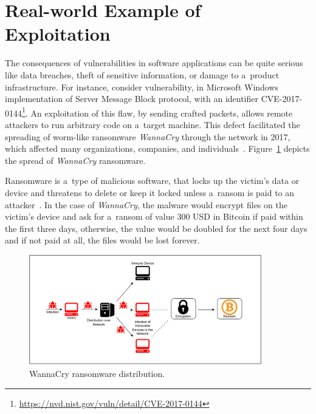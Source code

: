   \section{Real-world Example of Exploitation}
  The consequences of vulnerabilities in software applications can be quite serious like data breaches,
  theft of sensitive information, or damage to a~product infrastructure. For instance, consider
  vulnerability, in Microsoft Windows implementation of Server Message Block protocol, with an identifier
  CVE-2017-0144\footnote{\href{https://nvd.nist.gov/vuln/detail/CVE-2017-0144}{https://nvd.nist.gov/vuln/detail/CVE-2017-0144}}.
  An exploitation of this flaw, by sending crafted packets, allows remote attackers to run
  arbitrary code on a~target machine. This defect facilitated the spreading of worm-like ransomware
  \emph{WannaCry} through the network in 2017, which affected many organizations, companies,
  and individuals~\cite{WannaCry}. Figure~\ref{wannacryDistribution} depicts the spread of \emph{WannaCry} ransomware.

  Ransomware is a~type of malicious software, that locks up the victim's data or device and threatens to delete
  or keep it locked unless a~ransom is paid to an attacker~\cite{Malware}. In the case of \emph{WannaCry},
  the malware would encrypt files on the victim's device and ask for a~ransom of value 300 USD in Bitcoin
  if paid within the first three days, otherwise, the value would be doubled for the next four days and if
  not paid at all, the files would be lost forever.~\cite{wannacryBlog}

  \begin{figure}[h]
    \centering
    \includegraphics[width=0.9\textwidth]{obrazky-figures/wannacry_distribution_ransom.drawio.pdf}
    \caption{WannaCry ransomware distribution.}
    \label{wannacryDistribution}
  \end{figure}
